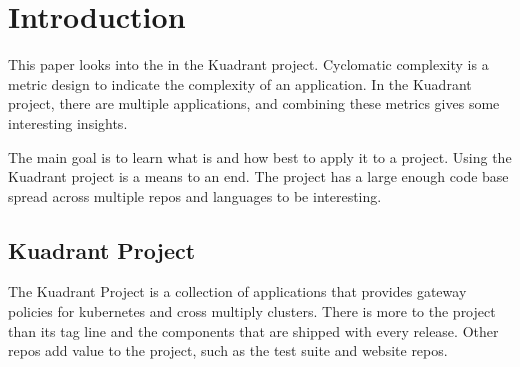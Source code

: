 \section{Introduction}

This paper looks into the \cc in the Kuadrant project.
Cyclomatic complexity is a metric design to indicate the complexity of an application.
In the Kuadrant project, there are multiple applications, and combining these metrics gives some interesting insights.

The main goal is to learn what \cc is and how best to apply it to a project.
Using the Kuadrant project is a means to an end.
The project has a large enough code base spread across multiple repos and languages to be interesting.

\subsection{Kuadrant Project}
The Kuadrant Project is a collection of applications that provides gateway policies for kubernetes and cross multiply clusters.
There is more to the project than its tag line and the components that are shipped with every release.
Other repos add value to the project, such as the test suite and website repos.


